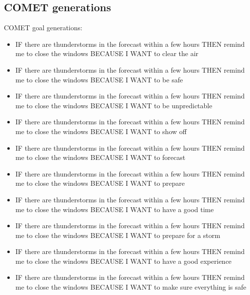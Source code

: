 \subsection*{COMET generations}

COMET goal generations:
\begin{itemize}
\item IF there are thunderstorms in the forecast within a few hours THEN remind me to close the windows BECAUSE I WANT to clear the air
\item IF there are thunderstorms in the forecast within a few hours THEN remind me to close the windows BECAUSE I WANT to be safe
\item IF there are thunderstorms in the forecast within a few hours THEN remind me to close the windows BECAUSE I WANT to be unpredictable
\item IF there are thunderstorms in the forecast within a few hours THEN remind me to close the windows BECAUSE I WANT to show off
\item IF there are thunderstorms in the forecast within a few hours THEN remind me to close the windows BECAUSE I WANT to forecast
\item IF there are thunderstorms in the forecast within a few hours THEN remind me to close the windows BECAUSE I WANT to prepare
\item IF there are thunderstorms in the forecast within a few hours THEN remind me to close the windows BECAUSE I WANT to have a good time
\item IF there are thunderstorms in the forecast within a few hours THEN remind me to close the windows BECAUSE I WANT to prepare for a storm
\item IF there are thunderstorms in the forecast within a few hours THEN remind me to close the windows BECAUSE I WANT to have a good experience
\item IF there are thunderstorms in the forecast within a few hours THEN remind me to close the windows BECAUSE I WANT to make sure everything is safe
\end{itemize}

